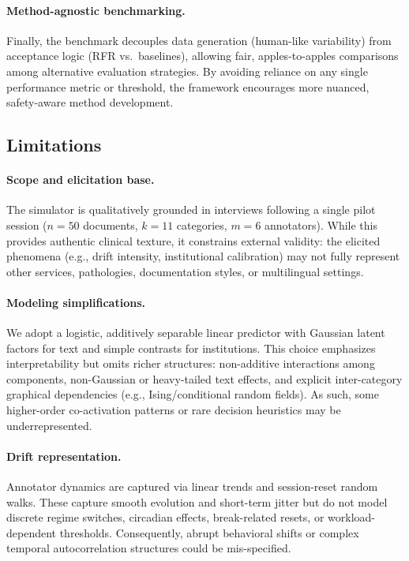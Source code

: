 \documentclass[12pt]{article}
\begin{document}
\paragraph{Method-agnostic benchmarking.}
Finally, the benchmark decouples data generation (human-like variability) from acceptance logic (RFR vs.\ baselines), allowing fair, apples-to-apples comparisons among alternative evaluation strategies. By avoiding reliance on any single performance metric or threshold, the framework encourages more nuanced, safety-aware method development.

\subsection{Limitations}

\paragraph{Scope and elicitation base.}
The simulator is qualitatively grounded in interviews following a single pilot session ($n=50$ documents, $k=11$ categories, $m=6$ annotators). While this provides authentic clinical texture, it constrains external validity: the elicited phenomena (e.g., drift intensity, institutional calibration) may not fully represent other services, pathologies, documentation styles, or multilingual settings.

\paragraph{Modeling simplifications.}
We adopt a logistic, additively separable linear predictor with Gaussian latent factors for text and simple contrasts for institutions. This choice emphasizes interpretability but omits richer structures: non-additive interactions among components, non-Gaussian or heavy-tailed text effects, and explicit inter-category graphical dependencies (e.g., Ising/conditional random fields). As such, some higher-order co-activation patterns or rare decision heuristics may be underrepresented.

\paragraph{Drift representation.}
Annotator dynamics are captured via linear trends and session-reset random walks. These capture smooth evolution and short-term jitter but do not model discrete regime switches, circadian effects, break-related resets, or workload-dependent thresholds. Consequently, abrupt behavioral shifts or complex temporal autocorrelation structures could be mis-specified.
\end{document}
